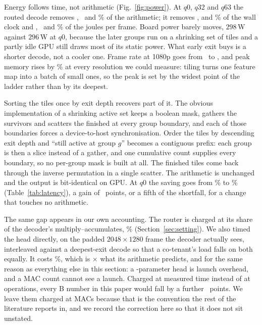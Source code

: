 \documentclass[10pt,twocolumn,letterpaper]{article}
\begin{document}
Energy follows time, not arithmetic (Fig.~\ref{fig:power}). At $q0$, $q32$ and $q63$ the routed decode
removes \PowerMacLow, \PowerMacMid\ and \PowerMacHigh\% of the arithmetic; it removes \PowerTimeLow, \PowerTimeMid
and \PowerTimeHigh\% of the wall clock and \PowerEnergyLow, \PowerEnergyMid\ and \PowerEnergyHigh\% of the joules per
frame. Board power barely moves, $298$\,W against $296$\,W at $q0$, because the
later groups run on a shrinking set of tiles and a partly idle GPU still draws
most of its static power. What early exit buys is a shorter decode, not a cooler
one. Frame rate at 1080p goes from \FpsFull\ to \FpsRouted, and peak memory rises by
\PeakDelta\% at every resolution we could measure: tiling turns one feature map into
a batch of small ones, so the peak is set by the widest point of the ladder
rather than by its deepest.

Sorting the tiles once by exit depth recovers part of it. The obvious
implementation of a shrinking active set keeps a boolean mask, gathers the
survivors and scatters the finished at every group boundary, and each of those
boundaries forces a device-to-host synchronisation. Order the tiles by
descending exit depth and ``still active at group $g$'' becomes a contiguous
prefix: each group is then a slice instead of a gather, and one cumulative count
supplies every boundary, so no per-group mask is built at all. The finished
tiles come back through the inverse permutation in a single scatter. The
arithmetic is unchanged and the output is bit-identical on GPU. At $q0$ the
saving goes from \WallMasked\% to \WallSorted\% (Table~\ref{tab:latency}), a
gain of \WallSortedGain\ points, or a fifth of the shortfall, for a change that
touches no arithmetic.

The same gap appears in our own accounting. The router is charged at its share of
the decoder's multiply--accumulates, \RouterCostPct\%
(Section~\ref{sec:setting}). We also timed the head directly, on the padded
$2048{\times}1280$ frame the decoder actually sees, interleaved against a
deepest-exit decode so that a co-tenant's load falls on both equally. It costs
\RouterTimePct\%, which is \RouterTimeFactor$\times$ what its arithmetic
predicts, and for the same reason as everything else in this section: a
\RouterParams-parameter head is launch overhead, and a MAC count cannot see a
launch. Charged at measured time instead of at operations, every B number in
this paper would fall by a further \RouterTimeExtra\ points. We leave them
charged at MACs because that is the convention the rest of the literature
reports in, and we record the correction here so that it does not sit unstated.
\end{document}
